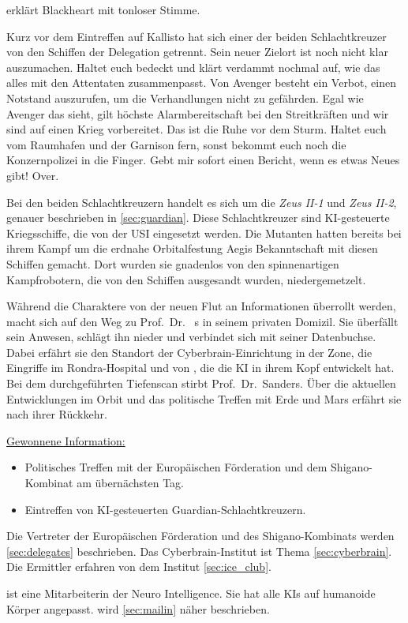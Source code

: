 erklärt Blackheart mit tonloser Stimme. 

\begin{speech}
	Kurz vor dem Eintreffen auf Kallisto hat sich einer der beiden Schlachtkreuzer von den Schiffen der Delegation getrennt. Sein neuer Zielort ist noch nicht klar auszumachen. Haltet euch bedeckt und klärt verdammt nochmal auf, wie das alles mit den Attentaten zusammenpasst. Von Avenger besteht ein Verbot, einen Notstand auszurufen, um die Verhandlungen nicht zu gefährden. Egal wie Avenger das sieht, gilt höchste Alarmbereitschaft bei den Streitkräften und wir sind auf einen Krieg vorbereitet. Das ist die Ruhe vor dem Sturm. Haltet euch vom Raumhafen und der Garnison fern, sonst bekommt euch noch die Konzernpolizei in die Finger. Gebt mir sofort einen Bericht, wenn es etwas Neues gibt! Over.
\end{speech}

\begin{remarks}
	Bei den beiden Schlachtkreuzern handelt es sich um die \emph{Zeus II-1} und \emph{Zeus II-2}, genauer beschrieben in \cref{sec:guardian}. Diese Schlachtkreuzer sind KI-gesteuerte Kriegsschiffe, die von der USI eingesetzt werden. Die Mutanten hatten bereits bei ihrem Kampf um die erdnahe Orbitalfestung Aegis Bekanntschaft mit diesen Schiffen gemacht. Dort wurden sie gnadenlos von den spinnenartigen Kampfrobotern, die von den Schiffen ausgesandt wurden, niedergemetzelt.
\end{remarks}


Während die Charaktere von der neuen Flut an Informationen überrollt werden, macht sich \xl{} auf den Weg zu Prof.~Dr.~	s in seinem privaten Domizil. Sie überfällt sein Anwesen, schlägt ihn nieder und verbindet sich mit seiner Datenbuchse. Dabei erfährt sie den Standort der Cyberbrain-Einrichtung in der Zone, die Eingriffe im Rondra-Hospital und von \ml{}, die die KI in ihrem Kopf entwickelt hat. Bei dem durchgeführten Tiefenscan stirbt Prof.~Dr.~Sanders. Über die aktuellen Entwicklungen im Orbit und das politische Treffen mit Erde und Mars erfährt sie nach ihrer Rückkehr.

\begin{remarks}
	\underline{Gewonnene Information:}
	
	\begin{itemize}
		\item Politisches Treffen mit der Europäischen Förderation und dem Shigano-Kombinat am übernächsten Tag.
		\item Eintreffen von KI-gesteuerten Guardian-Schlachtkreuzern.
	\end{itemize}

	Die Vertreter der Europäischen Förderation und des Shigano-Kombinats werden \cref{sec:delegates} beschrieben.
	Das Cyberbrain-Institut ist Thema \cref{sec:cyberbrain}. Die Ermittler erfahren von dem Institut
	\cref{sec:ice_club}.

	\ml{} ist eine Mitarbeiterin der Neuro Intelligence. Sie hat alle KIs auf humanoide Körper angepasst. \ml{} wird
	\cref{sec:mailin} näher beschrieben.
\end{remarks}
